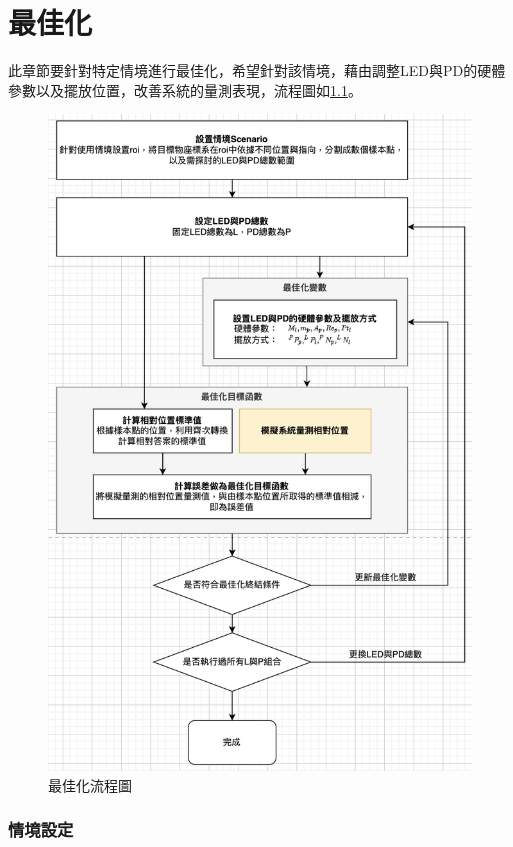 \chapter{最佳化}

此章節要針對特定情境進行最佳化，希望針對該情境，藉由調整LED與PD的硬體參數以及擺放位置，改善系統的量測表現，流程圖如\ref{flow:opt}。

\begin{figure}[ht]
    \centering
    \includegraphics[width=13cm]{ch4pic/flowchart_opt.png}
    \caption{最佳化流程圖}
    \label{flow:opt}
\end{figure}

\clearpage

\subsection{情境設定}

